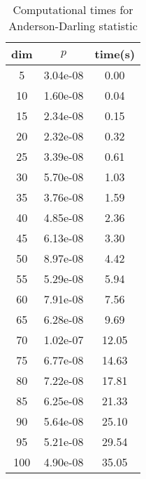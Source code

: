 \begin{table}[htbp]
\begin{center}
\begin{tabular}{ccc}
dim& $p$ & time(s)\\
\hline
5 & 3.04e-08 & 0.00 \\ 
10 & 1.60e-08 & 0.04 \\ 
15 & 2.34e-08 & 0.15 \\ 
20 & 2.32e-08 & 0.32 \\ 
25 & 3.39e-08 & 0.61 \\ 
30 & 5.70e-08 & 1.03 \\ 
35 & 3.76e-08 & 1.59 \\ 
40 & 4.85e-08 & 2.36 \\ 
45 & 6.13e-08 & 3.30 \\ 
50 & 8.97e-08 & 4.42 \\ 
55 & 5.29e-08 & 5.94 \\ 
60 & 7.91e-08 & 7.56 \\ 
65 & 6.28e-08 & 9.69 \\ 
70 & 1.02e-07 & 12.05 \\ 
75 & 6.77e-08 & 14.63 \\ 
80 & 7.22e-08 & 17.81 \\ 
85 & 6.25e-08 & 21.33 \\ 
90 & 5.64e-08 & 25.10 \\ 
95 & 5.21e-08 & 29.54 \\ 
100 & 4.90e-08 & 35.05 \\ 
\hline
\end{tabular}
\end{center}
\caption{Computational times for Anderson-Darling statistic}
\label{tab:AD}
\end{table}
